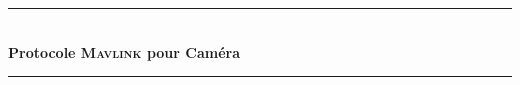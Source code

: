 \begin{titlepage}

  \newcommand{\HRule}{\rule{\linewidth}{0.5mm}} %
  
  \center %
   
  
  
  
  \HRule \\[0.4cm]
  { \huge \bfseries Protocole \textsc{Mavlink} pour Caméra }\\[0.4cm] %
  \HRule \\[1.5cm]
   
  
  

\end{titlepage}
